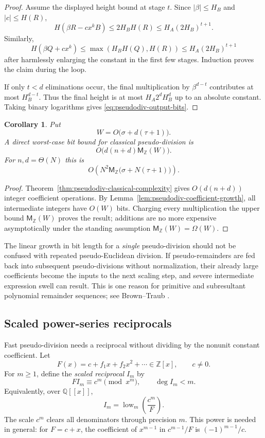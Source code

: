 \documentclass[11pt]{book}
\newtheorem{corollary}[theorem]{Corollary}
\theoremstyle{definition}
\newcommand{\ZZ}{\mathbb Z}
\newcommand{\MZ}{\mathsf M_{\ZZ}}
\begin{document}
\begin{proof}
Assume the displayed height bound at stage $t$.  Since
$|\beta|\le H_B$ and $|c|\le H(R)$,
\[
 H(\beta R-cx^kB)
 \le 2H_BH(R)
 \le H_A(2H_B)^{t+1}.
\]
Similarly,
\[
 H(\beta Q+cx^k)
 \le \max(H_BH(Q),H(R))
 \le H_A(2H_B)^{t+1}
\]
after harmlessly enlarging the constant in the first few stages.  Induction
proves the claim during the loop.

If only $t<d$ eliminations occur, the final multiplication by
$\beta^{d-t}$ contributes at most $H_B^{d-t}$.  Thus the final height is at
most $H_A2^dH_B^d$ up to an absolute constant.  Taking binary logarithms
gives \eqref{eq:pseudodiv-output-bits}.
\end{proof}

\begin{corollary}\label{cor:pseudodiv-classical-bit}
Put
\[
 W=O\bigl(\sigma+d(\tau+1)\bigr).
\]
A direct worst-case bit bound for classical pseudo-division is
\[
 O\bigl(d(n+d)\MZ(W)\bigr).
\]
For $n,d=\Theta(N)$ this is
\[
 O\!\left(N^2\MZ\bigl(\sigma+N(\tau+1)\bigr)\right).
\]
\end{corollary}

\begin{proof}
Theorem~\ref{thm:pseudodiv-classical-complexity} gives
$O(d(n+d))$ integer coefficient operations.  By
Lemma~\ref{lem:pseudodiv-coefficient-growth}, all intermediate integers have
$O(W)$ bits.  Charging every multiplication the upper bound $\MZ(W)$ proves
the result; additions are no more expensive asymptotically under the standing
assumption $\MZ(W)=\Omega(W)$.
\end{proof}

The linear growth in bit length for a \emph{single} pseudo-division should not
be confused with repeated pseudo-Euclidean division.  If pseudo-remainders are
fed back into subsequent pseudo-divisions without normalization, their already
large coefficients become the inputs to the next scaling step, and severe
intermediate expression swell can result.  This is one reason for primitive
and subresultant polynomial remainder sequences; see
Brown--Traub \cite{BrownTraub1971}.

\subsection{Scaled power-series reciprocals}

Fast pseudo-division needs a reciprocal without dividing by the nonunit
constant coefficient.  Let
\[
 F(x)=c+f_1x+f_2x^2+\cdots\in\ZZ[x],
 \qquad c\ne0.
\]
For $m\ge1$, define the \emph{scaled reciprocal} $I_m$ by
\begin{equation}\label{eq:scaled-inverse-definition}
 F I_m\equiv c^m\pmod{x^m},
 \qquad
 \deg I_m<m.
\end{equation}
Equivalently, over $\mathbb Q[[x]]$,
\[
 I_m=\operatorname{low}_m\!\left(\frac{c^m}{F}\right).
\]
The scale $c^m$ clears all denominators through precision $m$.  This power is
needed in general: for $F=c+x$, the coefficient of $x^{m-1}$ in
$c^{m-1}/F$ is $(-1)^{m-1}/c$.
\end{document}
